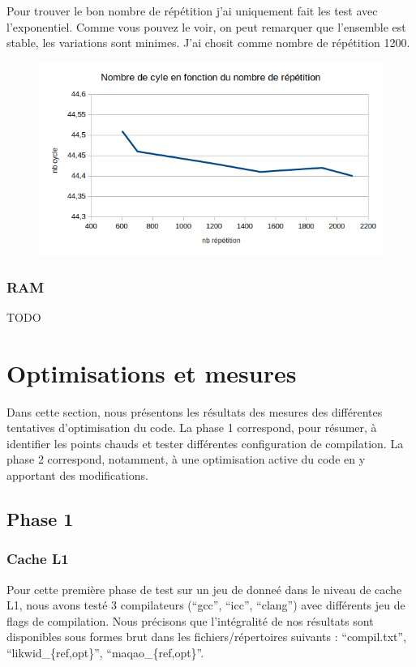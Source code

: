 \documentclass[12pt,a4paper]{article}
\begin{document}
Pour trouver le bon nombre de répétition j'ai uniquement fait les test avec
l'exponentiel. Comme vous pouvez le voir, on peut remarquer que l'ensemble est
stable, les variations sont minimes. J'ai chosit comme nombre de répétition
1200.
\begin{figure}[h]
    \includegraphics[scale=0.8]{figures/L2/L2repet.png}
    \caption{ }
\end{figure}

\subsubsection{RAM}

TODO

\section{Optimisations et mesures}

Dans cette section, nous présentons les résultats des mesures des différentes
tentatives d'optimisation du code. La phase 1 correspond, pour résumer, à
identifier les points chauds et tester différentes configuration de compilation.
La phase 2 correspond, notamment, à une optimisation active du code en y apportant
des modifications.

\subsection{Phase 1}

\subsubsection{Cache L1}

Pour cette première phase de test sur un jeu de donneé dans le niveau de cache
L1, nous avons testé 3 compilateurs (\enquote{gcc}, \enquote{icc},
\enquote{clang}) avec différents jeu de flags de compilation. Nous précisons que
l'intégralité de nos résultats sont disponibles sous formes brut dans les
fichiers/répertoires suivants : \enquote{compil.txt},
\enquote{likwid\_\{ref,opt\}}, \enquote{maqao\_\{ref,opt\}}.
\end{document}
